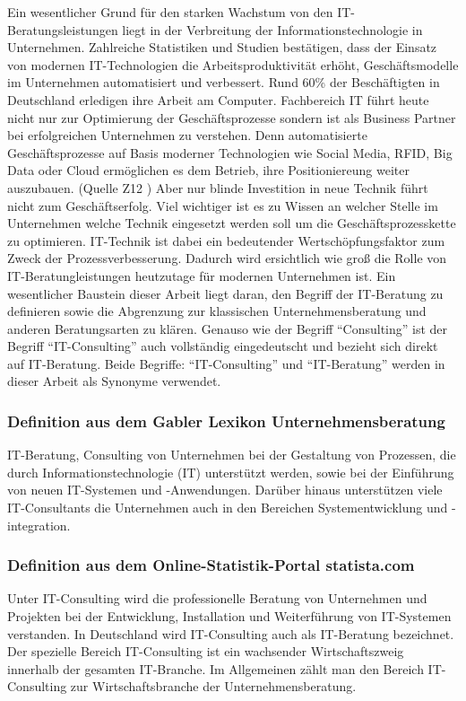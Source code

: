 		Ein wesentlicher Grund für den starken Wachstum von den IT-Beratungsleistungen liegt in der Verbreitung der Informationstechnologie in Unternehmen. Zahlreiche Statistiken und Studien bestätigen, dass der Einsatz von modernen IT-Technologien die Arbeitsproduktivität erhöht, Geschäftsmodelle im Unternehmen automatisiert und verbessert. Rund 60\% der Beschäftigten in Deutschland  erledigen ihre Arbeit am Computer.\cite{IreneBertschek.2011}
		Fachbereich IT führt heute nicht nur zur Optimierung der Geschäftsprozesse sondern ist als Business Partner bei erfolgreichen Unternehmen zu verstehen. Denn automatisierte Geschäftsprozesse auf Basis moderner Technologien wie Social Media, RFID, Big Data oder Cloud  ermöglichen es dem Betrieb, ihre Positioniereung weiter auszubauen. (Quelle Z12 )
		Aber nur blinde Investition in neue Technik führt nicht zum Geschäftserfolg. Viel wichtiger ist es zu Wissen an welcher Stelle im Unternehmen welche Technik eingesetzt werden soll um die Geschäftsprozesskette zu optimieren. IT-Technik ist dabei ein bedeutender Wertschöpfungsfaktor zum Zweck der Prozessverbesserung.
		Dadurch wird ersichtlich wie groß die Rolle von IT-Beratungleistungen heutzutage  für modernen Unternehmen ist. Ein wesentlicher Baustein dieser Arbeit liegt daran, den Begriff der IT-Beratung  zu definieren sowie die Abgrenzung zur klassischen Unternehmensberatung und anderen Beratungsarten  zu klären.
		Genauso wie der Begriff “Consulting” ist der Begriff “IT-Consulting” auch vollständig eingedeutscht und bezieht sich direkt auf IT-Beratung. Beide Begriffe: “IT-Consulting” und “IT-Beratung” werden in dieser Arbeit als Synonyme verwendet.
		\subsubsection{Definition aus dem Gabler Lexikon Unternehmensberatung}
			IT-Beratung, Consulting von Unternehmen bei der Gestaltung von Prozessen, die durch Informationstechnologie (IT) unterstützt werden, sowie bei der Einführung von neuen IT-Systemen und -Anwendungen. Darüber hinaus unterstützen viele IT-Consultants die Unternehmen auch in den Bereichen Systementwicklung und -integration.\cite{ReinekeBock200709}
			
		\subsubsection{ Definition aus dem Online-Statistik-Portal statista.com}
			Unter IT-Consulting wird die professionelle Beratung von Unternehmen und Projekten bei der Entwicklung, Installation und Weiterführung von IT-Systemen verstanden. In Deutschland wird IT-Consulting auch als IT-Beratung bezeichnet. Der spezielle Bereich IT-Consulting ist ein wachsender Wirtschaftszweig innerhalb der gesamten IT-Branche. Im Allgemeinen zählt man den Bereich IT-Consulting zur Wirtschaftsbranche der Unternehmensberatung.\cite{statistaITCons}
